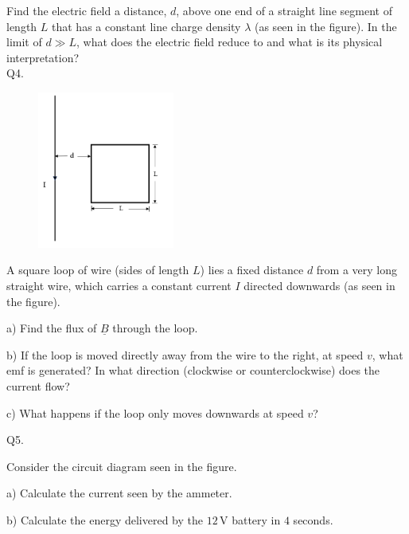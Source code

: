 \documentclass[a4paper,11pt]{article}
\begin{document}
\noindent Find the electric field a distance, \( d \), above one end of a straight line segment of length \( L \) that has a constant line charge density \( \lambda \) (as seen in the figure). In the limit of \( d \gg L \), what does the electric field reduce to and what is its physical interpretation? \\

\noindent Q4. 

\begin{figure}[t]
    \centering
    \includegraphics[width=0.4\textwidth]{EMq4figure.PNG}
    \caption*{}
\end{figure}

\noindent A square loop of wire (sides of length \( L \)) lies a fixed distance \( d \) from a very long straight wire, which carries a constant current \( I \) directed downwards (as seen in the figure).

\medskip

\noindent a) Find the flux of \( \underline{B} \) through the loop.

\medskip

\noindent b) If the loop is moved directly away from the wire to the right, at speed \( v \), what emf is generated? In what direction (clockwise or counterclockwise) does the current flow?

\medskip

\noindent c) What happens if the loop only moves downwards at speed \( v \)?

\newpage

\noindent Q5. 

\noindent Consider the circuit diagram seen in the figure. 

\noindent a) Calculate the current seen by the ammeter.

\medskip

\noindent b) Calculate the energy delivered by the \(12\, \text{V}\) battery in \(4\) seconds.
\end{document}
